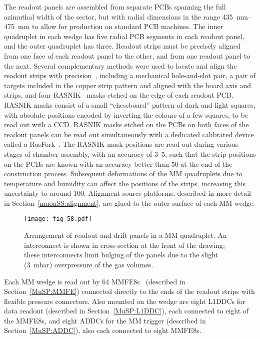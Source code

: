 \documentclass[cernpreprint, atlasdraft=false, UKenglish,british,orcidlogo, texmf, orcidlogo]{atlasdoc}
\begin{document}
The readout panels are assembled from separate \glspl{PCB} spanning the full azimuthal width of the sector, but with radial dimensions in the range \SIrange{435}{475}{\mm} to allow for production on standard \gls{PCB} machines.
The inner quadruplet in each wedge has five radial \gls{PCB} segments in each readout panel, and the outer quadruplet has three.
Readout strips must be precisely aligned from one face of each readout panel to the other, and from one readout panel to the next.
Several complementary methods were used to locate and align the readout strips with precision~\cite{Kuger_2016}, including a mechanical hole-and-slot pair, a pair of targets included in the copper strip pattern and aligned with the board axis and strips, and four \gls{RASNIK}~\cite{Beker_2019}
masks etched on the edge of each readout \gls{PCB}. \gls{RASNIK} masks consist of a small ``chessboard'' pattern of dark and light squares, with absolute positions encoded by inverting the colours of a few squares, to be read out with a CCD.
\gls{RASNIK} masks etched on the PCBs on both faces of the readout panels can be read out simultaneously with a dedicated calibrated device called a RasFork~\cite{ALLARD2022166143}.
The \gls{RASNIK} mask positions are read out during various stages of chamber assembly, with an accuracy of \SIrange{3}{5}{\micron}, such that the strip positions on the \glspl{PCB} are known with an accuracy better than \SI{50}{\micron} at the end of the construction process.
Subsequent deformations of the \gls{MM} quadruplets due to temperature and humidity can affect the positions of the strips, increasing this uncertainty to around \SI{100}{\micron}.
Alignment source platforms, described in more detail in Section~\ref{muonSS:alignment}, are glued to the outer surface of each \gls{MM} wedge.
 
\begin{figure}[!h]
\centerline{\texttt{[image: fig\_58.pdf]}}
\caption{Arrangement of readout and drift panels in a \gls{MM} quadruplet. An interconnect is shown in cross-section at the front of the drawing; these interconnects limit bulging of the panels due to the slight (\SI{3}{\milli\bar}) overpressure of the gas volumes.}
\label{fig:Muon_MMquad}
\end{figure}
 
Each \gls{MM} wedge is read out by \num{64}  \glspl{MMFE8}~\cite{Iakovidis_LaRochelle} (described in Section~\ref{MuSP:MMFE})
connected directly to the ends of the readout strips with flexible pressure connectors. 
Also mounted on the wedge are eight \glspl{L1DDC} for data readout (described in Section~\ref{MuSP:L1DDC}), each connected to eight of the \glspl{MMFE8}, and eight \glspl{ADDC} for the \gls{MM} trigger (described in Section~\ref{MuSP:ADDC}), also each connected to eight \glspl{MMFE8}.
 
\end{document}
